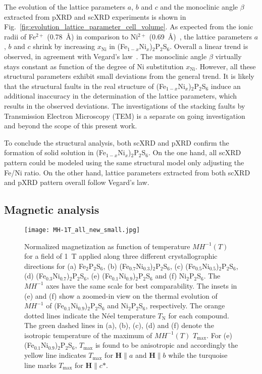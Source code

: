 \documentclass[twocolumn,superscriptaddress,prb,preprintnumbers,nobibnotes,aps]{revtex4-2}  %
\begin{document}
The evolution of the lattice parameters $a$, $b$ and $c$ and the monoclinic angle $\beta$ extracted from pXRD and scXRD experiments is shown in Fig.~\ref{fig:evolution_lattice_parameter_cell_volume}. As expected from the ionic radii of Fe$^{2+}$ (0.78~\AA) in comparison to Ni$^{2+}$ (0.69~\AA)~\cite{RShannon1976}, the lattice parameters $a$, $b$ and $c$ shrink by increasing $x_\textrm{Ni}$ in (Fe$_{1-x}$Ni$_x$)$_2$P$_2$S$_6$. Overall a linear trend is observed, in agreement with Vegard's law~\cite{Vegard1921}. The monoclinic angle $\beta$ virtually stays constant as function of the degree of Ni substitution $x_\textrm{Ni}$. However, all these structural parameters exhibit small deviations from the general trend. It is likely that the structural faults in the real structure of (Fe$_{1-x}$Ni$_x$)$_2$P$_2$S$_6$ induce an additional inaccuracy in the determination of the lattice parameters, which results in the observed deviations. The investigations of the stacking faults by Transmission Electron Microscopy (TEM) is a separate on going investigation and beyond the scope of this present work. 

To conclude the structural analysis, both scXRD and pXRD confirm the formation of solid solution in (Fe$_{1-x}$Ni$_x$)$_2$P$_2$S$_6$. On the one hand, all scXRD pattern could be modeled using the same structural model only adjusting the Fe/Ni ratio. On the other hand, lattice parameters extracted from both scXRD and pXRD pattern overall follow Vegard's law.

\subsection{Magnetic analysis}

\begin{figure*}[tb]
\texttt{[image: MH-1T\_all\_new\_small.jpg]}
\caption{Normalized magnetization as function of temperature $MH^{-1}(T)$ for a field of 1~T applied along three different crystallographic directions for (a) Fe$_2$P$_2$S$_6$, (b) (Fe$_{0.7}$Ni$_{0.3}$)$_2$P$_2$S$_6$, (c) (Fe$_{0.5}$Ni$_{0.5}$)$_2$P$_2$S$_6$, (d) (Fe$_{0.3}$Ni$_{0.7}$)$_2$P$_2$S$_6$, (e) (Fe$_{0.1}$Ni$_{0.9}$)$_2$P$_2$S$_6$ and (f) Ni$_2$P$_2$S$_6$. The $MH^{-1}$ axes have the same scale for best comparability. The insets in (e) and (f) show a zoomed-in view on the thermal evolution of $MH^{-1}$ of (Fe$_{0.1}$Ni$_{0.9}$)$_2$P$_2$S$_6$ and Ni$_2$P$_2$S$_6$, respectively. The orange dotted lines indicate the N\'{e}el temperature $T_\textrm{N}$ for each compound. The green dashed lines in (a), (b), (c), (d) and (f) denote the isotropic temperature of the maximum of $MH^{-1}(T)$ $T_\textrm{max}$. For (e) (Fe$_{0.1}$Ni$_{0.9}$)$_2$P$_2$S$_6$, $T_\textrm{max}$ is found to be anisotropic and accordingly the yellow line indicates $T_\textrm{max}$ for $\boldsymbol{H} \parallel a$ and $\boldsymbol{H} \parallel b$ while the turquoise line marks $T_\textrm{max}$ for $\boldsymbol{H} \parallel c\textrm{*}$.}
\label{fig:MH-1_T_evolution}
\end{figure*}
\end{document}
